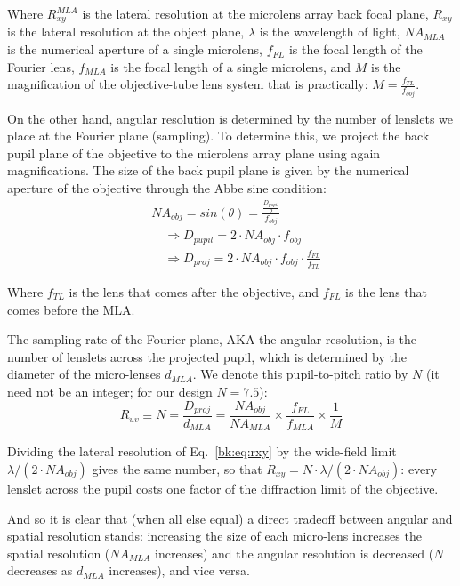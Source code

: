 Where $R_{xy}^{MLA}$ is the lateral resolution at the microlens array back focal plane, $R_{xy}$ is the lateral resolution at the object plane, $\lambda$ is the wavelength of light, $NA_{MLA}$ is the numerical aperture of a single microlens, $f_{FL}$ is the focal length of the Fourier lens, $f_{MLA}$ is the focal length of a single microlens, and $M$ is the magnification of the objective-tube lens system that is practically: $M = \frac{f_{TL}}{f_{obj}}$.

On the other hand, angular resolution is determined by the number of lenslets we place at the Fourier plane (sampling). To determine this, we project the back pupil plane of the objective to the microlens array plane using again magnifications. The size of the back pupil plane is given by the numerical aperture of the objective through the Abbe sine condition:
\begin{equation}
\begin{split}
    &NA_{obj} = sin(\theta) = \frac{\frac{D_{pupil}}{2}}{f_{obj}} \\
    &\quad\Rightarrow D_{pupil} = 2\cdot NA_{obj}\cdot f_{obj} \\
    &\quad\Rightarrow D_{proj} = 2\cdot NA_{obj}\cdot f_{obj}\cdot \frac{f_{FL}}{f_{TL}}
\end{split}
\end{equation}

Where $f_{TL}$ is the lens that comes after the objective, and $f_{FL}$ is the lens that comes before the MLA.

The sampling rate of the Fourier plane, AKA the angular resolution, is the number of lenslets across the projected pupil, which is determined by the diameter of the micro-lenses $d_{MLA}$. We denote this pupil-to-pitch ratio by $N$ (it need not be an integer; for our design $N=7.5$):
\begin{equation}
    R_{uv} \equiv N = \frac{D_{proj}}{d_{MLA}} = \frac{NA_{obj}}{NA_{MLA}}\times \frac{f_{FL}}{f_{MLA}}\times \frac{1}{M}
\end{equation}

Dividing the lateral resolution of Eq.~\eqref{bk:eq:rxy} by the wide-field limit $\lambda/(2\cdot NA_{obj})$ gives the same number, so that $R_{xy}=N\cdot\lambda/(2\cdot NA_{obj})$: every lenslet across the pupil costs one factor of the diffraction limit of the objective.

And so it is clear that (when all else equal) a direct tradeoff between angular and spatial resolution stands: increasing the size of each micro-lens increases the spatial resolution ($NA_{MLA}$ increases) and the angular resolution is decreased ($N$ decreases as $d_{MLA}$ increases), and vice versa.

